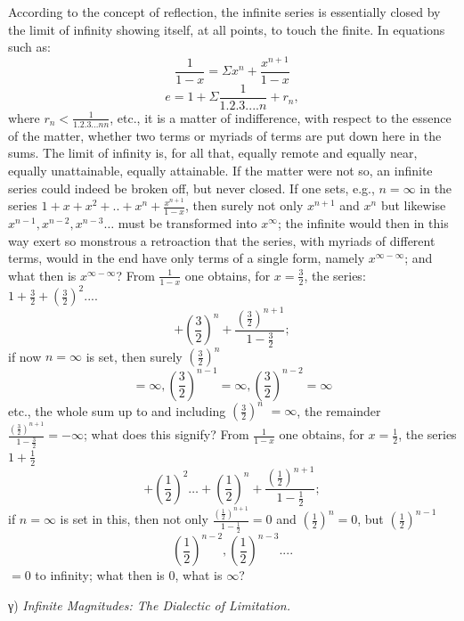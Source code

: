 \documentclass[12pt,a4paper,openany]{book}
\newcommand{\opage}[1]{\marginnote{\footnotesize\textit{[#1]}}}
\begin{document}
\setcounter{footnote}{0}%
\opage{69}According to the concept of reflection, the infinite series is essentially closed by the limit of infinity showing itself, at all points, to touch the finite. In equations such as:
\[ \frac{1}{1-x}=\Sigma x^{n}+\frac{x^{n+1}}{1-x} \]
\[ e=1+\Sigma\frac{1}{1.2.3....n}+r_{n}, \]
where $r_{n}<\frac{1}{1.2.3...nn}$, etc., it is a matter of indifference, with respect to the essence of the matter, whether two terms or myriads of terms are put down here in the sums. The limit of infinity is, for all that, equally remote and equally near, equally unattainable, equally attainable. If the matter were not so, an infinite series could indeed be broken off, but never closed. If one sets, e.g., $n=\infty$ in the series $1+x+x^{2}+..+x^{n}+\frac{x^{n+1}}{1-x}$, then surely not only $x^{n+1}$ and $x^{n}$ but likewise $x^{n-1}, x^{n-2}, x^{n-3}\ldots$ must be transformed into $x^{\infty}$; the infinite would then in this way exert so monstrous a retroaction that the series, with myriads of different terms, would in the end have only terms of a single form, namely $x^{\infty-\infty}$; and what then is $x^{\infty-\infty}$?
From $\frac{1}{1-x}$ one obtains, for $x=\frac{3}{2}$, the series: $1+\frac{3}{2}+\left(\frac{3}{2}\right)^{2}....$
\[ +\left(\frac{3}{2}\right)^{n}+\frac{\left(\frac{3}{2}\right)^{n+1}}{1-\frac{3}{2}} ; \]
if now $n=\infty$ is set, then surely $\left(\frac{3}{2}\right)^{n}$
\[ =\infty, \left(\frac{3}{2}\right)^{n-1}=\infty, \left(\frac{3}{2}\right)^{n-2}=\infty \]
etc., the whole sum up to and including $\left(\frac{3}{2}\right)^{n}$ $=\infty$, the remainder $\frac{\left(\frac{3}{2}\right)^{n+1}}{1-\frac{3}{2}}=-\infty$; what
\setcounter{footnote}{0}%
\opage{70}does this signify? From $\frac{1}{1-x}$ one obtains, for $x=\frac{1}{2}$, the series $1+\frac{1}{2}$
\[ +\left(\frac{1}{2}\right)^{2}\ldots+\left(\frac{1}{2}\right)^{n}+\frac{\left(\frac{1}{2}\right)^{n+1}}{1-\frac{1}{2}} ; \]
if $n=\infty$ is set in this, then not only $\frac{\left(\frac{1}{2}\right)^{n+1}}{1-\frac{1}{2}}=0$ and $\left(\frac{1}{2}\right)^{n}=0$, but $\left(\frac{1}{2}\right)^{n-1}$
\[ \left(\frac{1}{2}\right)^{n-2}, \left(\frac{1}{2}\right)^{n-3}.... \]
$=0$ to infinity; what then is $0$, what is $\infty$?

\begin{center}γ) \emph{Infinite Magnitudes: The Dialectic of Limitation.}\end{center}
\end{document}
